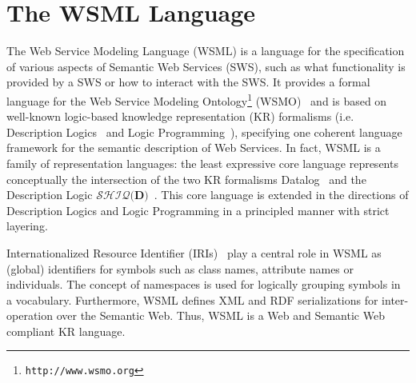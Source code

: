 \section{The WSML Language}\label{sec:wsml}

%
The Web Service Modeling Language (WSML) is a language for the
specification of various aspects of Semantic Web Services (SWS),
such as what functionality is provided by a SWS or how to interact
with the SWS. It provides a formal language for the Web Service
Modeling Ontology\footnote{\tt http://www.wsmo.org} (WSMO)~\cite{roman05:_web_servic_model_ontol} and is based on well-known logic-based
knowledge representation (KR) formalisms (i.e. Description
Logics~\cite{Baader+CalvaneseETAL-DescLogiHand:03}
and Logic Programming~\cite{lloyd-FoundationsOfLP}), specifying one coherent language framework
for the semantic description of Web Services. In fact, WSML is a family of representation languages: the least expressive
core language represents conceptually the intersection of the two
KR formalisms Datalog~\cite{datalog} and the Description Logic $\mathcal{SHIQ}(\mathbf{D)}$~\cite{Horrocks+Patel-SchneiderETAL-FromSHIQ:03}.
This core language is extended in the directions of Description
Logics and Logic Programming in a principled manner with strict
layering.

Internationalized Resource Identifier (IRIs)~\cite{Duerst+Suignard-InteResoIden:05}
play a central role
in WSML as (global) identifiers for symbols such as class names,
attribute names or individuals. The concept of namespaces is used for
logically grouping symbols in a vocabulary. Furthermore, WSML
defines XML and RDF serializations for inter-operation over the
Semantic Web. Thus, WSML is a Web and Semantic Web compliant KR
language.

